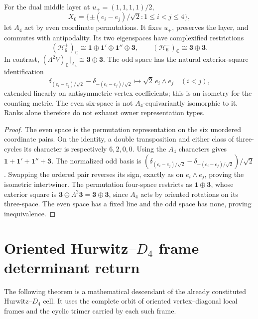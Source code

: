 \documentclass[11pt]{article}
\begin{document}
\begin{proposition}
\label{p1:prop:v214-antipodal-six-representation-distinction}
For the dual middle layer at \(u_+=(1,1,1,1)/2\),
\[
 X_0=\{\pm(e_i-e_j)/\sqrt2:1\le i<j\le4\},
\]
let \(A_4\) act by even coordinate permutations. It fixes \(u_+\),
preserves the layer, and commutes with antipodality. Its two eigenspaces
have complexified restrictions
\[
 (\mathcal H_6^+)_{\mathbb C}
 \cong\mathbf1\oplus\mathbf1'\oplus\mathbf1''\oplus\mathbf3,
 \qquad
 (\mathcal H_6^-)_{\mathbb C}\cong\mathbf3\oplus\mathbf3.
\]
In contrast,
\((\Lambda^2V)_{\mathbb C}|_{A_4}\cong\mathbf3\oplus\mathbf3\).
The odd space has the natural exterior-square identification
\[
 \delta_{(e_i-e_j)/\sqrt2}-\delta_{-(e_i-e_j)/\sqrt2}
 \longmapsto\sqrt2\,e_i\wedge e_j
 \quad(i<j),
\]
extended linearly on antisymmetric vertex coefficients; this is an
isometry for the counting metric. The even six-space is not
\(A_4\)-equivariantly isomorphic to it. Ranks alone therefore do not
exhaust owner representation types.
\end{proposition}
\begin{proof}
The even space is the permutation representation on the six unordered
coordinate pairs. On the identity, a double transposition and either
class of three-cycles its character is respectively \(6,2,0,0\).
Using the \(A_4\) characters gives
\(\mathbf1+\mathbf1'+\mathbf1''+\mathbf3\).
The normalized odd basis is
\((\delta_{(e_i-e_j)/\sqrt2}-\delta_{-(e_i-e_j)/\sqrt2})/\sqrt2\).
Swapping the ordered pair reverses its sign, exactly as on
\(e_i\wedge e_j\), proving the isometric intertwiner. The permutation
four-space restricts as \(\mathbf1\oplus\mathbf3\), whose exterior
square is \(\mathbf3\oplus\Lambda^2\mathbf3
=\mathbf3\oplus\mathbf3\), since \(A_4\) acts by oriented rotations
on its three-space. The even space has a fixed line and the odd space
has none, proving inequivalence.
\end{proof}

\section{Oriented Hurwitz--\texorpdfstring{\(D_4\)}{D4} frame determinant return}
\label{p1:sec:v559-d4-frame-determinant-return}

The following theorem is a mathematical descendant of the already constituted
Hurwitz--\(D_4\) cell.  It uses the complete orbit of oriented vertex--diagonal
local frames and the cyclic trimer carried by each such frame.
\end{document}
